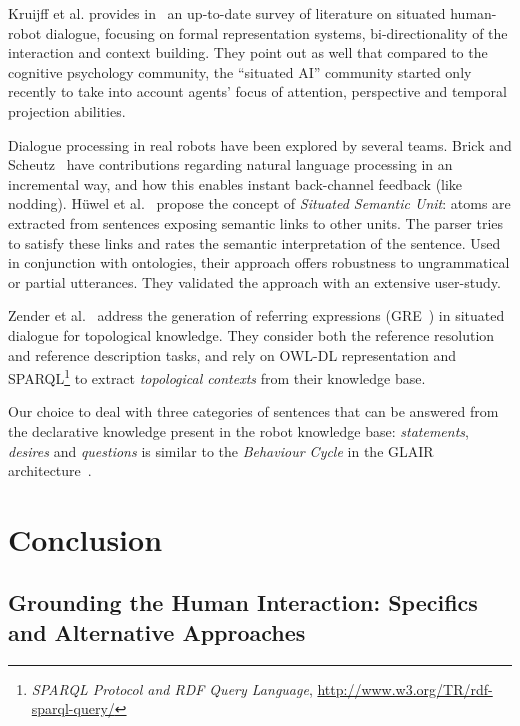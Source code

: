 \documentclass{svmult}
\begin{document}
Kruijff et al. provides in~\cite{Kruijff2010} an up-to-date survey of
literature on situated human-robot dialogue, focusing on formal representation
systems, bi-directionality of the interaction and context building. They point
out as well that compared to the cognitive psychology community, the ``situated
AI'' community started only recently to take into account agents' focus of
attention, perspective and temporal projection abilities.

Dialogue processing in real robots have been explored by several teams.  Brick
and Scheutz~\cite{Brick2007} have contributions regarding natural language
processing in an incremental way, and how this enables instant back-channel
feedback (like nodding). Hüwel et al.~\cite{Huwel2006} propose the concept of
\textit{Situated Semantic Unit}: atoms are extracted from sentences exposing
semantic links to other units. The parser tries to satisfy these links and
rates the semantic interpretation of the sentence. Used in conjunction with
ontologies, their approach offers robustness to ungrammatical or partial
utterances. They validated the approach with an extensive user-study.

Zender et al.~\cite{Zender2009} address the generation of referring expressions
(GRE~\cite{Dale1995}) in situated dialogue for topological knowledge.  They consider
both the reference resolution and reference description tasks, and rely on
OWL-DL representation and SPARQL\footnote{{\em SPARQL Protocol and RDF Query
Language}, \url{http://www.w3.org/TR/rdf-sparql-query/}} to extract
\emph{topological contexts} from their knowledge base.

Our choice to deal with three categories of sentences that can be answered
from the declarative knowledge present in the robot knowledge base:
\emph{statements}, \emph{desires} and \emph{questions} is similar to the \emph{Behaviour Cycle} in the GLAIR
architecture~\cite{Shapiro2009}.



\section{Conclusion}
\label{conclusion}

\subsection{Grounding the Human Interaction: Specifics and Alternative Approaches}
\end{document}
